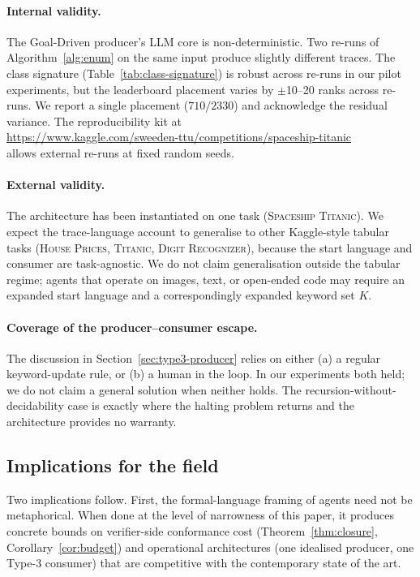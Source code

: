 \paragraph{Internal validity.}
The Goal-Driven producer's LLM core is non-deterministic.  Two
re-runs of Algorithm~\ref{alg:enum} on the same input produce
slightly different traces.  The class signature
(Table~\ref{tab:class-signature}) is robust across re-runs in
our pilot experiments, but the leaderboard placement varies by
$\pm$10--20 ranks across re-runs.  We report a single placement
($710/2330$) and acknowledge the residual variance.  The
reproducibility kit at\\
\url{https://www.kaggle.com/sweeden-ttu/competitions/spaceship-titanic}\\
allows external re-runs at fixed random seeds.

\paragraph{External validity.}
The architecture has been instantiated on one task
(\textsc{Spaceship Titanic}).  We expect the trace-language
account to generalise to other Kaggle-style tabular tasks
(\textsc{House Prices}, \textsc{Titanic},
\textsc{Digit Recognizer}), because the start language and
consumer are task-agnostic.  We do not claim generalisation
outside the tabular regime; agents that operate on images, text,
or open-ended code may require an expanded start language and a
correspondingly expanded keyword set $K$.

\paragraph{Coverage of the producer--consumer escape.}
The discussion in Section~\ref{sec:type3-producer} relies on
either (a) a regular keyword-update rule, or (b) a human in the
loop.  In our experiments both held; we do not claim a general
solution when neither holds.  The recursion-without-decidability
case is exactly where the halting problem returns and the
architecture provides no warranty.

\subsection{Implications for the field}

Two implications follow.  First, the formal-language framing of
agents need not be metaphorical.  When done at the level of
narrowness of this paper, it produces concrete bounds on
verifier-side conformance cost (Theorem~\ref{thm:closure},
Corollary~\ref{cor:budget}) and operational architectures (one
idealised producer, one Type-3 consumer) that are competitive with
the contemporary state of the art.

